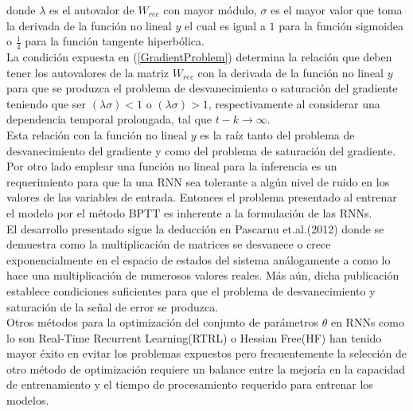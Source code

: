 \documentclass{article}
\begin{document}
	donde $\lambda$ es el autovalor de $W_{rec}$ con mayor módulo, $\sigma$ es el mayor valor que toma la derivada de la función no lineal $y$ el cual es igual a $1$ para la función sigmoidea o $\frac{1}{4}$ para la función tangente hiperbólica.\\
	La condición expuesta en (\ref{GradientProblem}) determina la relación que deben tener los autovalores de la matriz $W_{rec}$ con la derivada de la función no lineal $y$ para que se produzca el problema de desvanecimiento o saturación del gradiente teniendo que ser $(\lambda \sigma) < 1$ o  $(\lambda \sigma) > 1$, respectivamente al considerar una dependencia temporal prolongada, tal que $t-k \rightarrow \infty$.\\
	Esta relación con la función no lineal $y$ es la raíz tanto del problema de desvanecimiento del gradiente y como del problema de saturación del gradiente. \\
	Por otro lado emplear una función no lineal para la inferencia es un requerimiento para que la una RNN sea tolerante a algún nivel de ruido en los valores de las variables de entrada\cite{24LongTermDependenciesBengio}. Entonces el problema presentado al entrenar el modelo por el método BPTT es inherente a la formulación de las RNNs.\\
	
	El desarrollo presentado sigue la deducción en Pascarnu et.al.(2012) donde se demuestra como la multiplicación de matrices se desvanece o crece exponencialmente en el espacio de estados del sistema análogamente a como lo hace una multiplicación de numerosos valores reales. Más aún, dicha publicación establece condiciones suficientes para que el problema de desvanecimiento y saturación de la señal de error se produzca.\\
	
	Otros métodos para la optimización del conjunto de parámetros $\theta$ en RNNs como lo son Real-Time Recurrent Learning(RTRL) o Hessian Free(HF)\cite{20SutskeverPhdThesis} han tenido mayor éxito en evitar los problemas expuestos pero frecuentemente la selección de otro método de optimización requiere un balance entre la mejoría en la capacidad de entrenamiento y el tiempo de procesamiento requerido para entrenar los modelos.
	
\end{document}

